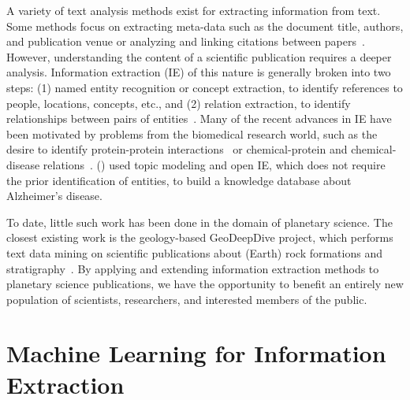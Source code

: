 \documentclass[letterpaper]{article} %
\begin{document}
A variety of text analysis methods exist for extracting information
from text.  Some methods focus on extracting meta-data such as the
document title, authors, and publication venue or analyzing and
linking citations between papers~\cite{ronzano:scipub16}.
%
However, understanding the content of a scientific publication
requires a deeper analysis.  Information extraction (IE) of this
nature is generally broken into two steps: (1) named entity
recognition or concept extraction, to identify references to people,
locations, concepts, etc., and (2) relation extraction, to identify
relationships between pairs of entities~\cite{mooney:ie05}.  Many of
the recent advances in IE have been motivated by problems from the
biomedical research world, such as the desire to identify
protein-protein interactions~\cite{tikk:protein10,bui:protein11} or
chemical-protein and chemical-disease
relations~\cite{krallinger:chemistry17}.  \citeauthor{tsutsui:ad16}
(\citeyear{tsutsui:ad16}) used topic modeling and open IE, which does
not require the prior identification of entities, to build a knowledge
database about Alzheimer's disease.

To date, little such work has been done in the domain of planetary
science. The closest existing work is the geology-based GeoDeepDive
project, which performs text data mining on scientific publications
about (Earth) rock formations and
stratigraphy~\cite{zhang:geodeepdive13}.
%
By applying and extending information extraction methods to planetary
science publications, we have the opportunity to benefit an entirely
new population of scientists, researchers, and interested members of
the public.

\section{Machine Learning for Information Extraction}
\end{document}
